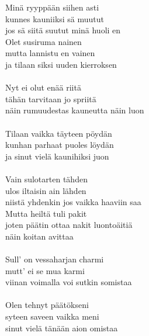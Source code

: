 
            Minä ryyppään siihen asti  \\
            kunnes kauniiksi sä muutut \\
            jos sä siitä suutut minä huoli en \\
            Olet susiruma nainen \\
            mutta lannistu en vainen  \\
            ja tilaan siksi uuden kierroksen \\
\hspace{10mm} \\
            Nyt ei olut enää riitä \\
            tähän tarvitaan jo spriitä  \\
            näin rumuudestas kauneutta näin luon \\
\hspace{10mm} \\
            Tilaan vaikka täyteen pöydän  \\
            kunhan parhaat puoles löydän  \\
            ja sinut vielä kaunihiksi juon \\
\hspace{10mm} \\
            Vain sulotarten tähden \\
            ulos iltaisin ain lähden \\
            niistä yhdenkin jos vaikka haaviin saa \\
            Mutta heiltä tuli pakit \\
            joten päätin ottaa nakit luontoäitiä  \\
            näin koitan avittaa \\
\hspace{10mm} \\
            Sull' on vessaharjan charmi  \\
            mutt' ei se mua karmi  \\
            viinan voimalla voi sutkin somistaa \\
\hspace{10mm} \\
            Olen tehnyt päätökseni  \\
            syteen saveen vaikka meni  \\
            sinut vielä tänään aion omistaa \\
